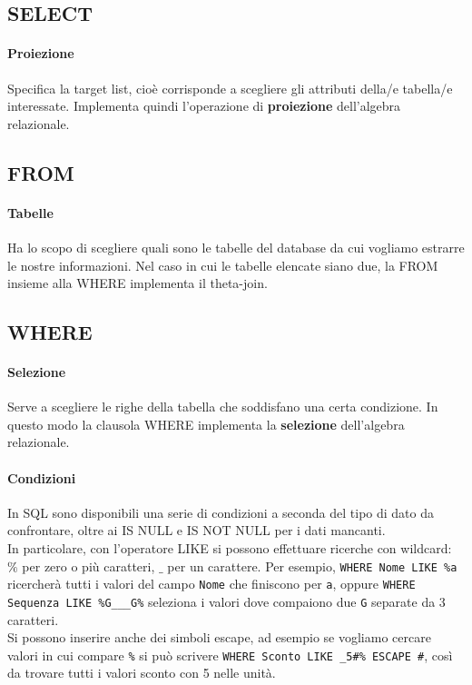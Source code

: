 \documentclass[10pt]{book}
\begin{document}
\subsection{SELECT}
\paragraph{Proiezione} Specifica la target list, cioè corrisponde a scegliere gli attributi della/e tabella/e interessate. Implementa quindi l'operazione di \textbf{proiezione} dell'algebra relazionale.
\subsection{FROM}
\paragraph{Tabelle} Ha lo scopo di scegliere quali sono le tabelle del database da cui vogliamo estrarre le nostre informazioni. Nel caso in cui le tabelle elencate siano due, la FROM insieme alla WHERE implementa il theta-join.
\subsection{WHERE}
\paragraph{Selezione} Serve a scegliere le righe della tabella che soddisfano una certa condizione. In questo modo la clausola WHERE implementa la \textbf{selezione} dell'algebra relazionale.
\paragraph{Condizioni} In SQL sono disponibili una serie di condizioni a seconda del tipo di dato da confrontare, oltre ai IS NULL e IS NOT NULL per i dati mancanti.\\
In particolare, con l'operatore LIKE si possono effettuare ricerche con wildcard: $\%$ per zero o più caratteri, $\_$ per un carattere. Per esempio, \texttt{WHERE Nome LIKE \%a} ricercherà tutti i valori del campo \texttt{Nome} che finiscono per \texttt{a}, oppure \texttt{WHERE Sequenza LIKE \%G\_\_\_G\%} seleziona i valori dove compaiono due \texttt{G} separate da 3 caratteri.\\
Si possono inserire anche dei simboli escape, ad esempio se vogliamo cercare valori in cui compare \texttt{\%} si può scrivere \texttt{WHERE Sconto LIKE \_5\#\% ESCAPE \#}, così da trovare tutti i valori sconto con 5 nelle unità.
\end{document}
